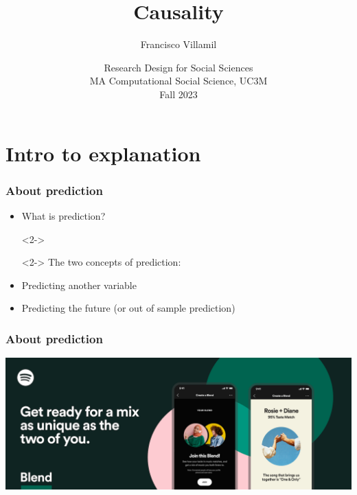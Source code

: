 \documentclass[aspectratio=43]{beamer}
\title[Lecture 3: Causality]{\Large Causality}
\author[]{Francisco Villamil}
\date[]{Research Design for Social Sciences\\MA Computational Social Science, UC3M\\Fall 2023}
\begin{document}

\begin{frame}
  \titlepage
\end{frame}

%
%

\section{Intro to explanation}

\begin{frame}
\frametitle{About prediction}
\centering

\begin{itemize}
  \item<1-> What is prediction?
  \item[]<2->
  \item[]<2-> The two concepts of prediction:
  \item<2-> Predicting another variable
  \item<2-> Predicting the future (or out of sample prediction)
\end{itemize}

\end{frame}

\begin{frame}
\frametitle{About prediction}
\centering

\includegraphics[width = \textwidth]{../img/spotify}

\end{frame}
\end{document}
